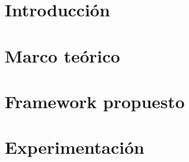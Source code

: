 \documentclass[11pt,a4paper,spanish]{book}
\begin{document}
\frontmatter




%

%

\mainmatter

\chapter{Introducción}











\chapter{Marco teórico}





\chapter{Framework propuesto}



\chapter{Experimentación}






\end{document}
